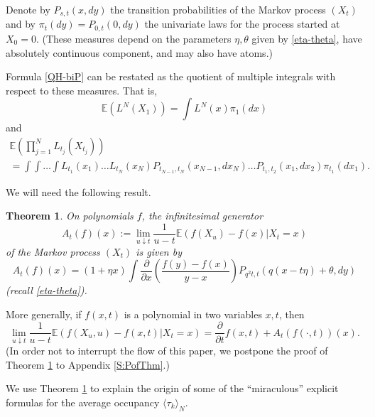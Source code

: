 \documentclass{amsart}
\newtheorem{theorem}{Theorem}[section]
\theoremstyle{definition}
\theoremstyle{remark}
\theoremstyle{remark}
\theoremstyle{definition}
\numberwithin{equation}{section}
\begin{document}
  Denote by $P_{s,t}(x,dy)$ the transition probabilities of the Markov process $(X_t)$ and by $\pi_t(dy)=P_{0,t}(0,dy)$
  the univariate laws for the process started at $X_0=0$. (These measures depend on the parameters   $\eta,\theta$ given by \eqref{eta-theta},
  have absolutely continuous component, and may also have atoms.)

  Formula \eqref{QH-biP} can be restated as the quotient of  multiple integrals with respect to these measures. That is,
  $${\mathds{E}}\left(L^N(X_1)\right)=\int L^N(x)\pi_1(dx)$$
  and
\begin{multline*}
{\mathds{E}}\left(\prod_{j=1}^NL_{t_j}(X_{t_j})\right)\\
=\int \int\dots\int L_{t_1}(x_1)\dots L_{t_N}(x_N)P_{t_{N-1},t_N}(x_{N-1},dx_N)\dots P_{t_{1},t_2}(x_{1},dx_2) \pi_{t_1}(dx_1).
\end{multline*}

  We will need the following result.
  \begin{theorem}
    \label{Thm-gen-biPoisson} {}
    On polynomials $f$, the infinitesimal generator
    $$A_t(f)(x):=\lim_{u\downarrow t} \frac{1}{u-t}{\mathds{E}}(f(X_u)-f(x)|X_t=x)$$ of the Markov process $(X_t)$ is given by
    \begin{equation}
      \label{A}
      A_t(f)(x)=(1+\eta x)\int \frac{\partial}{\partial x}\left(\frac{f(y)-f(x)}{y-x}\right) P_{q^2 t, t}(q(x-t\eta)+\theta,dy)
    \end{equation}
(recall \eqref{eta-theta}).
  \end{theorem}
More generally, if $f(x,t)$ is a polynomial in two variables $x,t$, then
\begin{equation}\label{BetterA}
  \lim_{u\downarrow t} \frac{1}{u-t}{\mathds{E}}(f(X_u,u)-f(x,t)|X_t=x)=\frac{\partial}{\partial t}f(x,t)+A_t(f(\cdot, t))(x).
\end{equation}
(In order not to interrupt the flow of this paper, we postpone  the proof  of Theorem \ref{Thm-gen-biPoisson} to Appendix \ref{S:PofThm}.)

  We use Theorem \ref{Thm-gen-biPoisson} to explain the origin of  some of the ``miraculous'' explicit formulas for the average occupancy
  $\langle\tau_k\rangle_N$.
\end{document}
